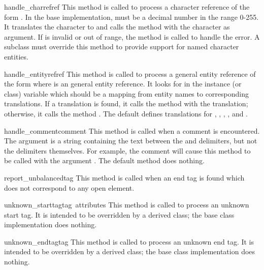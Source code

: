 \begin{funcdesc}{handle_charref}{ref}
This method is called to process a character reference of the form
.  In the base implementation,  must
be a decimal number in the
range 0-255.  It translates the character to \ASCII{} and calls the
method  with the character as argument.  If
 is invalid or out of range, the method
 is called to handle the error.  A
subclass must override this method to provide support for named
character entities.
\end{funcdesc}

\begin{funcdesc}{handle_entityref}{ref}
This method is called to process a general entity reference of the form
 where  is an general entity
reference.  It looks for  in the instance (or class)
variable  which should be a mapping from entity names
to corresponding translations.
If a translation is found, it calls the method 
with the translation; otherwise, it calls the method
.  The default 
defines translations for , , ,
, and .
\end{funcdesc}

\begin{funcdesc}{handle_comment}{comment}
This method is called when a comment is encountered.  The
 argument is a string containing the text between the
\samp{<!--} and \samp{-->} delimiters, but not the delimiters
themselves.  For example, the comment  will
cause this method to be called with the argument .  The
default method does nothing.
\end{funcdesc}

\begin{funcdesc}{report_unbalanced}{tag}
This method is called when an end tag is found which does not
correspond to any open element.
\end{funcdesc}

\begin{funcdesc}{unknown_starttag}{tag\, attributes}
This method is called to process an unknown start tag.  It is intended
to be overridden by a derived class; the base class implementation
does nothing.
\end{funcdesc}

\begin{funcdesc}{unknown_endtag}{tag}
This method is called to process an unknown end tag.  It is intended
to be overridden by a derived class; the base class implementation
does nothing.
\end{funcdesc}

